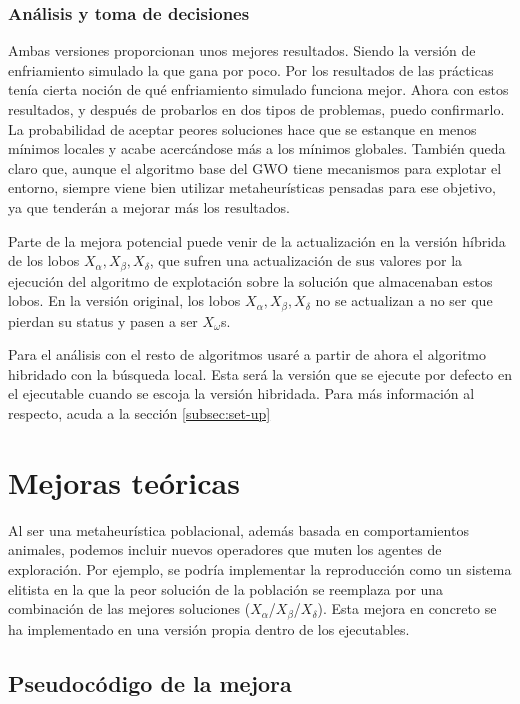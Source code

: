 \documentclass[a4paper]{report}
\begin{document}
\subsubsection*{Análisis y toma de decisiones}
Ambas versiones proporcionan unos mejores resultados. Siendo la versión de enfriamiento simulado la que gana por poco. Por los resultados de las prácticas tenía cierta noción de qué enfriamiento simulado funciona mejor. Ahora con estos resultados, y después de probarlos en dos tipos de problemas, puedo confirmarlo. La probabilidad de aceptar peores soluciones hace que se estanque en menos mínimos locales y acabe acercándose más a los mínimos globales. También queda claro que, aunque el algoritmo base del GWO tiene mecanismos para explotar el entorno, siempre viene bien utilizar metaheurísticas pensadas para ese objetivo, ya que tenderán a mejorar más los resultados.

Parte de la mejora potencial puede venir de la actualización en la versión híbrida de los lobos $X_\alpha,X_\beta,X_\delta$, que sufren una actualización de sus valores por la ejecución del algoritmo de explotación sobre la solución que almacenaban estos lobos. En la versión original, los lobos $X_\alpha,X_\beta,X_\delta$ no se actualizan a no ser que pierdan su status y pasen a ser $X_\omega$s.

Para el análisis con el resto de algoritmos usaré a partir de ahora el algoritmo hibridado con la búsqueda local. Esta será la versión que se ejecute por defecto en el ejecutable cuando se escoja la versión hibridada. Para más información al respecto, acuda a la sección \ref{subsec:set-up}



\section{Mejoras teóricas}
Al ser una metaheurística poblacional, además basada en comportamientos animales, podemos incluir nuevos operadores que muten los agentes de exploración. Por ejemplo, se podría implementar la reproducción como un sistema elitista en la que la peor solución de la población se reemplaza por una combinación de las mejores soluciones ($X_\alpha$/$X_\beta$/$X_\delta$). Esta mejora en concreto se ha implementado en una versión propia dentro de los ejecutables.



\subsection{Pseudocódigo de la mejora}
\end{document}
